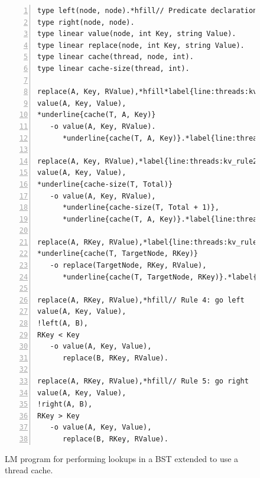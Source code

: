 \begin{figure}[ht]
\begin{Verbatim}[numbers=left,fontsize=\codesize,commandchars=*\{\}]
type left(node, node).*hfill// Predicate declaration
type right(node, node).
type linear value(node, int Key, string Value).
type linear replace(node, int Key, string Value).
type linear cache(thread, node, int).
type linear cache-size(thread, int).

replace(A, Key, RValue),*hfill*label{line:threads:kv_rule1_start}// Rule 1: key exists and is also in the cache
value(A, Key, Value),
*underline{cache(T, A, Key)}
   -o value(A, Key, RValue).
      *underline{cache(T, A, Key)}.*label{line:threads:kv_rule1_end}

replace(A, Key, RValue),*label{line:threads:kv_rule2_start}*hfill// Rule 2: key exists and is not in the cache
value(A, Key, Value),
*underline{cache-size(T, Total)}
   -o value(A, Key, RValue),
      *underline{cache-size(T, Total + 1)},
      *underline{cache(T, A, Key)}.*label{line:threads:kv_rule2_end}

replace(A, RKey, RValue),*label{line:threads:kv_rule3_start}*hfill// Rule 3: cached by the thread
*underline{cache(T, TargetNode, RKey)}
   -o replace(TargetNode, RKey, RValue),
      *underline{cache(T, TargetNode, RKey)}.*label{line:threads:kv_rule3_end}

replace(A, RKey, RValue),*hfill// Rule 4: go left
value(A, Key, Value),
!left(A, B),
RKey < Key
   -o value(A, Key, Value),
      replace(B, RKey, RValue).

replace(A, RKey, RValue),*hfill// Rule 5: go right
value(A, Key, Value),
!right(A, B),
RKey > Key
   -o value(A, Key, Value),
      replace(B, RKey, RValue).
\end{Verbatim}
\caption{LM program for performing lookups in a BST extended to use a thread cache.}
\label{code:threads:btree_lookup_cache}
\end{figure}

\begin{table}[ht]
   \begin{center}
      
   \end{center}

   \caption{Fact statistics for the \textbf{Regular} version and the
   \textbf{Cached} version.}
   \label{results:threads:key_value}
\end{table}

